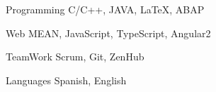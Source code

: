


\begin{cvskills}


\cvskill
{Programming} %
{C/C++, JAVA, \LaTeX{}, ABAP} %


\cvskill
{Web} %
{MEAN, JavaScript, TypeScript, Angular2} %

\cvskill
{TeamWork} %
{Scrum, Git, ZenHub} %

\cvskill
{Languages} %
{Spanish, English} %


\end{cvskills}
